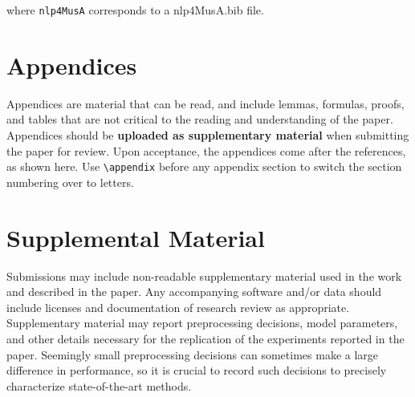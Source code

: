 \documentclass[11pt,a4paper]{article}
\begin{document}
where \verb|nlp4MusA| corresponds to a nlp4MusA.bib file.




\appendix

\section{Appendices}
\label{sec:appendix}
Appendices are material that can be read, and include lemmas, formulas, proofs, and tables that are not critical to the reading and understanding of the paper. 
Appendices should be \textbf{uploaded as supplementary material} when submitting the paper for review. Upon acceptance, the appendices come after the references, as shown here. Use
\verb|\appendix| before any appendix section to switch the section
numbering over to letters.


\section{Supplemental Material}
\label{sec:supplemental}
Submissions may include non-readable supplementary material used in the work and described in the paper. Any accompanying software and/or data should include licenses and documentation of research review as appropriate. Supplementary material may report preprocessing decisions, model parameters, and other details necessary for the replication of the experiments reported in the paper. Seemingly small preprocessing decisions can sometimes make a large difference in performance, so it is crucial to record such decisions to precisely characterize state-of-the-art methods. 
\end{document}

